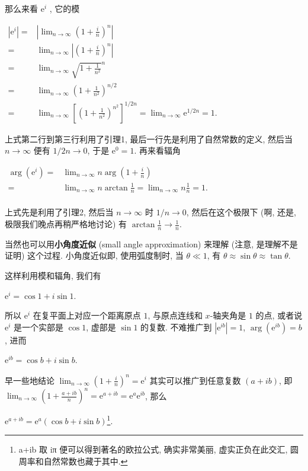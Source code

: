 \begin{tcolorbox}[size=fbox, breakable, enhanced jigsaw, title={复数的指数形式}]
那么来看 $\mathrm{e}^i$ , 它的模

$\begin{aligned} |\mathrm{e}^i|=&\left|\lim_{n\rightarrow\infty}\left(1+\frac{i}{n}\right)^n\right|\\ =&\lim_{n\rightarrow\infty}\left|\left(1+\frac{i}{n}\right)^n\right|\\ =&\lim_{n\rightarrow\infty}\sqrt{1+\frac{1}{n^2}}^n\\ =&\lim_{n\rightarrow\infty}\left(1+\frac{1}{n^2}\right)^{n/2}\\ =&\lim_{n\rightarrow\infty}\left[\left(1+\frac{1}{n^2}\right)^{n^2}\right]^{1/2n}=\lim_{n\rightarrow\infty}\mathrm{e}^{1/2n}=1. \end{aligned}$

上式第二行到第三行利用了引理1, 最后一行先是利用了自然常数的定义, 然后当
$n\rightarrow\infty$ 便有 $1/2n\rightarrow0$, 于是
$\mathrm{e}^0=1$. 再来看辐角

$\begin{aligned} \arg(\mathrm{e}^i)=&\lim_{n\rightarrow\infty}n\arg\left(1+\frac{i}{n}\right)\\ =&\lim_{n\rightarrow\infty}n\arctan\frac{1}{n}=\lim_{n\rightarrow\infty}n\frac{1}{n}=1.\\ \end{aligned}$

上式先是利用了引理2, 然后当 $n\rightarrow\infty$ 时
$1/n\rightarrow0$, 然后在这个极限下 (啊, 还是,
极限我们晚点再稍严格地讨论) 有
$\arctan\frac{1}{n}\rightarrow\frac{1}{n}$.

\begin{newquote}
当然也可以用\textbf{小角度近似} (small angle approximation) 来理解
(注意, 是理解不是证明) 这个过程. 小角度近似即, 使用弧度制时, 当
$\theta\ll1$, 有 $\theta\approx\sin\theta\approx\tan\theta$.
\end{newquote}

这样利用模和辐角, 我们有

$\mathrm{e}^i=\cos1+i\sin1$.

所以 $\mathrm{e}^i$ 在复平面上对应一个距离原点 $1$, 与原点连线和
$x$-轴夹角是 $1$ 的点, 或者说 $\mathrm{e}^i$ 是一个实部是
$\cos1$, 虚部是 $\sin1$ 的复数. 不难推广到 $|\mathrm{e}^{ib}|=1$,
$\arg(\mathrm{e}^{ib})=b$, 进而

$\mathrm{e}^{ib}=\cos b+i\sin b$.

早一些地结论
$\lim_{n\rightarrow\infty}\left(1+\frac{i}{n}\right)^n=\mathrm{e}^i$
其实可以推广到任意复数 $(a+ib)$, 即
$\lim_{n\rightarrow\infty}\left(1+\frac{a+ib}{n}\right)^n=\mathrm{e}^{a+ib}=\mathrm{e}^{a}\mathrm{e}^{ib}$,
那么

$\boxed{\mathrm{e}^{a+ib}=\mathrm{e}^a(\cos b+i\sin b)}$\footnote{a+ib
  取 iπ 便可以得到著名的欧拉公式, 确实非常美丽, 虚实正负在此交汇,
  圆周率和自然常数也藏于其中.}.

\end{tcolorbox}
